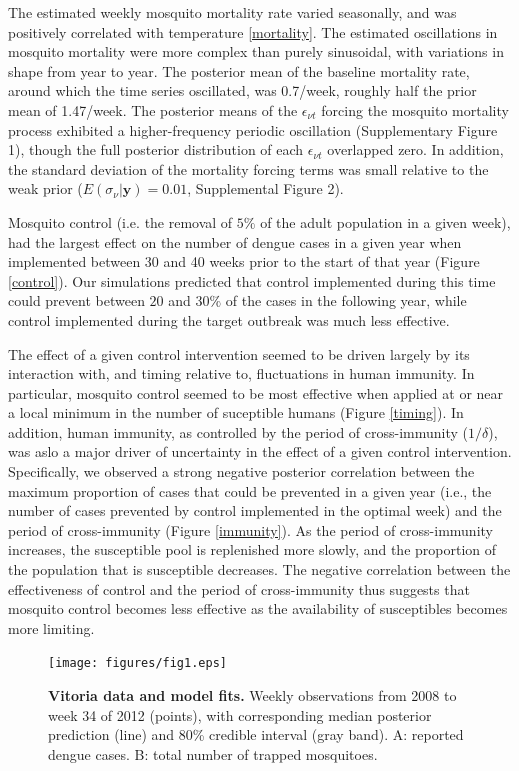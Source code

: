 \documentclass[10pt,letterpaper]{article}
\begin{document}
The estimated weekly mosquito mortality rate varied seasonally, and was positively correlated with temperature \ref{mortality}.
The estimated oscillations in mosquito mortality were more complex than purely sinusoidal, with variations in shape from year to year.
The posterior mean of the baseline mortality rate, around which the time series oscillated, was 0.7/week, roughly half the prior mean of 1.47/week.
The posterior means of the $\epsilon_{\nu t}$ forcing the mosquito mortality process exhibited a higher-frequency periodic oscillation (Supplementary Figure 1), though the full posterior distribution of each $\epsilon_{\nu t}$ overlapped zero.
In addition, the standard deviation of the mortality forcing terms was small relative to the weak prior ($E(\sigma_{\nu}|\mathbf{y}) = 0.01$, Supplemental Figure 2).

Mosquito control (i.e. the removal of $5\%$ of the adult population in a given week), had the largest effect on the number of dengue cases in a given year when implemented between 30 and 40 weeks prior to the start of that year (Figure \ref{control}).
Our simulations predicted that control implemented during this time could prevent between $20$ and $30\%$ of the cases in the following year, while control implemented during the target outbreak was much less effective.

The effect of a given control intervention seemed to be driven largely by its interaction with, and timing relative to, fluctuations in human immunity.
In particular, mosquito control seemed to be most effective when applied at or near a local minimum in the number of suceptible humans (Figure \ref{timing}).
In addition, human immunity, as controlled by the period of cross-immunity ($1/\delta$), was aslo a major driver of uncertainty in the effect of a given control intervention.
Specifically, we observed a strong negative posterior correlation between the maximum proportion of cases that could be prevented in a given year (i.e., the number of cases prevented by control implemented in the optimal week) and the period of cross-immunity (Figure \ref{immunity}). 
As the period of cross-immunity increases, the susceptible pool is replenished more slowly, and the proportion of the population that is susceptible decreases.
The negative correlation between the effectiveness of control and the period of cross-immunity thus suggests that mosquito control becomes less effective as the availability of susceptibles  becomes more limiting.

\begin{figure}[!h]
\texttt{[image: figures/fig1.eps]}
\caption{{\bf Vitoria data and model fits.}
Weekly observations from 2008 to week 34 of 2012 (points), with corresponding median posterior prediction (line) and 80\% credible interval (gray band). A: reported dengue cases. B: total number of trapped mosquitoes.
}
\label{timeseries}
\end{figure}
\end{document}
